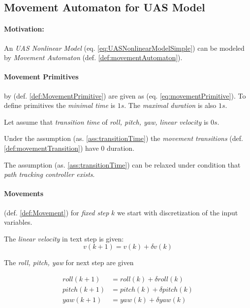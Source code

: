 \subsection{Movement Automaton for UAS Model}\label{s:movementAutomatonDefinition}

\paragraph{Motivation:} An \emph{UAS Nonlinear Model} (eq. \ref{eq:UASNonlinearModelSimple}) can be modeled by \emph{Movement Automaton} (def. \ref{def:movementAutomaton}). 

\paragraph{Movement Primitives} by (def. \ref{def:MovementPrimitive})  are given as (eq. \ref{eq:movementPrimitive}). To define primitives the \emph{minimal time} is $1 s$. The \emph{maximal duration} is also $1s$. 

\begin{assumption}\label{ass:transitionTime}
    Let assume that \emph{transition time} of \emph{roll, pitch, yaw, linear velocity} is $0 s$.
\end{assumption}

Under the assumption (as. \ref{ass:transitionTime}) the \emph{movement transitions} (def. \ref{def:movementTransition}) have $0$ duration.

\begin{note}
    The assumption (as. \ref{ass:transitionTime}) can be relaxed under condition that \emph{path tracking controller exists}.
\end{note}

\paragraph{Movements} (def. \ref{def:Movement}) for \emph{fixed step} $k$ we start with discretization of the input variables.

The \emph{linear velocity} in text step is given:
\begin{equation}\label{eq:applyMovement}
    v(k+1) = v(k) +\delta v(k)
\end{equation}

The \emph{roll, pitch, yaw} for next step are given 

\begin{equation}\label{eq:applyMovement1}
    \begin{aligned}
        roll(k+1)  &= roll(k) + \delta roll(k)\\
        pitch(k+1) & = pitch(k) + \delta pitch(k)\\
        yaw(k+1) & = yaw(k) + \delta yaw(k)\\
    \end{aligned}    
\end{equation}

